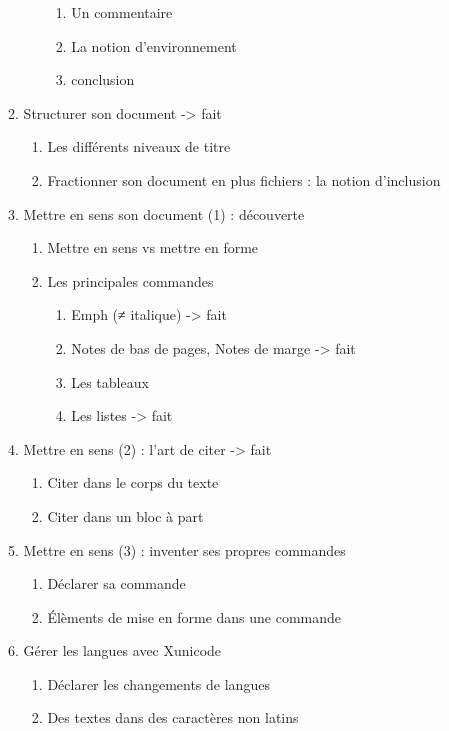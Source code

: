 \begin{enumerate}
\begin{enumerate}
\begin{enumerate}
\begin{enumerate}
			\item Un commentaire
			\item La notion d'environnement
			\item conclusion	
		\end{enumerate}
	\end{enumerate} 
	\item{Structurer son document}						-> fait
		\begin{enumerate}	
		\item Les différents niveaux de titre
		\item Fractionner son document en plus fichiers : la notion d'inclusion
		\end{enumerate}
	\item Mettre en sens son document (1) : découverte
	\begin{enumerate}
		\item Mettre en sens vs mettre en forme
		\item Les principales commandes
		\begin{enumerate}
			\item Emph (≠ italique)					-> fait
			\item Notes de bas de pages, Notes de marge	-> fait
			\item Les tableaux
			\item Les listes						-> fait
		\end{enumerate}
	\end{enumerate}
	\item Mettre en sens (2) : l'art de citer					-> fait
		\begin{enumerate}
		\item Citer dans le corps du texte	
		\item Citer dans un bloc à part
		\end{enumerate}
	\item Mettre en sens (3) : inventer ses propres commandes
		\begin{enumerate}
		\item Déclarer sa commande
		\item Élèments de mise en forme dans une commande
		\end{enumerate}
	\item Gérer les langues avec Xunicode
		\begin{enumerate}
		\item Déclarer les changements de langues
		\item Des textes dans des caractères non latins

\end{enumerate}
\end{enumerate}
\end{enumerate}
